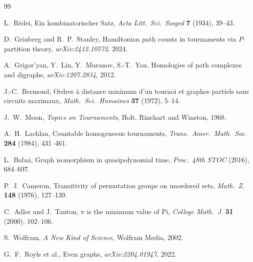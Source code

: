 \documentclass[11pt,a4paper]{article}
\theoremstyle{definition}
\theoremstyle{remark}
\begin{document}
\begin{thebibliography}{99}

L.~R\'edei, Ein kombinatorischer Satz, \emph{Acta Litt.\ Sci.\ Szeged} \textbf{7} (1934), 39--43.

D.~Grinberg and R.~P.~Stanley, Hamiltonian path counts in tournaments via $P$-partition theory, \emph{arXiv:2412.10572}, 2024.

A.~Grigor'yan, Y.~Lin, Y.~Muranov, S.-T.~Yau, Homologies of path complexes and digraphs, \emph{arXiv:1207.2834}, 2012.

J.-C.~Bermond, Ordres \`a distance minimum d'un tournoi et graphes partiels sans circuits maximaux, \emph{Math.\ Sci.\ Humaines} \textbf{37} (1972), 5--14.

J.~W.~Moon, \emph{Topics on Tournaments}, Holt, Rinehart and Winston, 1968.

A.~H.~Lachlan, Countable homogeneous tournaments, \emph{Trans.\ Amer.\ Math.\ Soc.} \textbf{284} (1984), 431--461.

L.~Babai, Graph isomorphism in quasipolynomial time, \emph{Proc.\ 48th STOC} (2016), 684--697.

P.~J.~Cameron, Transitivity of permutation groups on unordered sets, \emph{Math.\ Z.} \textbf{148} (1976), 127--139.

C.~Adler and J.~Tanton, $\pi$ is the minimum value of Pi, \emph{College Math.\ J.} \textbf{31} (2000), 102--106.

S.~Wolfram, \emph{A New Kind of Science}, Wolfram Media, 2002.

G.~F.~Royle et al., Even graphs, \emph{arXiv:2204.01947}, 2022.

\end{thebibliography}
\end{document}
